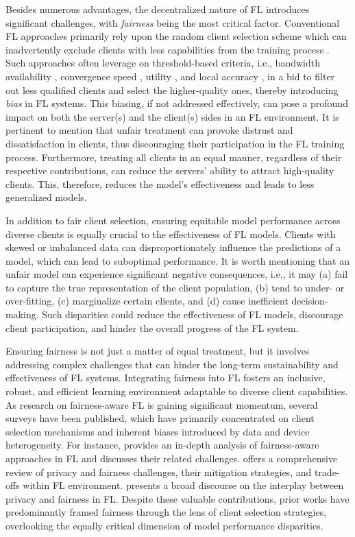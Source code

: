 \documentclass{article}
\begin{document}
Besides numerous advantages, the decentralized nature of FL introduces significant challenges, with {\em fairness} being the most critical factor. Conventional FL approaches primarily rely upon the random client selection scheme \cite{mcmahan2017communication,XiangLi} which can inadvertently exclude clients with less capabilities from the training process \cite{balakrishnan2022diverse}. Such approaches often leverage on threshold-based criteria, i.e., bandwidth availability \cite{Xu_bandwidth}, convergence speed \cite{convergencespeed}, utility \cite{OORT}, and local accuracy \cite{AAAImodelperformance}, in a bid to filter out less qualified clients and select the higher-quality ones, thereby introducing {\em bias} in FL systems. This biasing, if not addressed effectively, can pose a profound impact on both the server(s) and the client(s) sides in an FL environment. It is pertinent to mention that unfair treatment can provoke distrust and dissatisfaction in clients, thus discouraging their participation in the FL training process. Furthermore, treating all clients in an equal manner, regardless of their respective contributions, can reduce the servers' ability to attract high-quality clients. This, therefore, reduces the model's effectiveness and leads to less generalized models.

In addition to fair client selection, ensuring equitable model performance across diverse clients is equally crucial to the effectiveness of FL models. Clients with skewed or imbalanced data can disproportionately influence the predictions of a model, which can lead to suboptimal performance. It is worth mentioning that an unfair model can experience significant negative consequences, i.e., it may (a) fail to capture the true representation of the client population, (b) tend to under- or over-fitting, (c) marginalize certain clients, and (d) cause inefficient decision-making. Such disparities could reduce the effectiveness of FL models, discourage client participation, and hinder the overall progress of the FL system.

Ensuring fairness is not just a matter of equal treatment, but it involves addressing complex challenges that can hinder the long-term sustainability and effectiveness of FL systems. Integrating fairness into FL fosters an inclusive, robust, and efficient learning environment adaptable to diverse client capabilities. As research on fairness-aware FL is gaining significant momentum, 
several surveys have been published, which have primarily concentrated on client selection mechanisms and inherent biases introduced by data and device heterogeneity. For instance, \cite{Shi} provides an in-depth analysis of fairness-aware approaches in FL and discusses their related challenges. \cite{chen2023privacy} offers a comprehensive review of privacy and fairness challenges, their mitigation strategies, and trade-offs within FL environment. \cite{rafi2024fairness} presents a broad discourse on the interplay between privacy and fairness in FL. 
Despite these valuable contributions, prior works have predominantly framed fairness through the lens of client selection strategies, overlooking the equally critical dimension of model performance disparities. 
\end{document}
